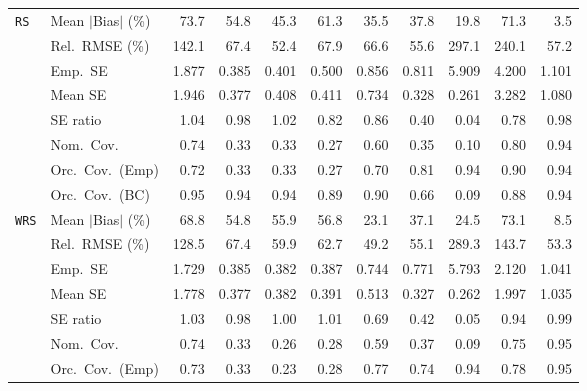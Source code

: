 \begin{landscape}
\begin{longtable}{llrrrrrrrrr}
\addlinespace[2pt]
\quad \texttt{RS} & Mean $|$Bias$|$ (\%) & 73.7 & 54.8 & 45.3 & 61.3 & \cellcolor{rankthree}35.5 & 37.8 & \cellcolor{ranktwo}19.8 & 71.3 & \cellcolor{rankone}3.5 \\
 & Rel.\ RMSE (\%) & 142.1 & 67.4 & \cellcolor{rankone}52.4 & 67.9 & 66.6 & \cellcolor{ranktwo}55.6 & 297.1 & 240.1 & \cellcolor{rankthree}57.2 \\
 & Emp.\ SE & 1.877 & 0.385 & 0.401 & 0.500 & 0.856 & 0.811 & 5.909 & 4.200 & 1.101 \\
 & Mean SE & 1.946 & 0.377 & 0.408 & 0.411 & 0.734 & 0.328 & 0.261 & 3.282 & 1.080 \\
 & SE ratio & \cellcolor{ranktwo}1.04 & \cellcolor{rankone}0.98 & \cellcolor{rankone}1.02 & 0.82 & \cellcolor{rankthree}0.86 & 0.40 & 0.04 & 0.78 & \cellcolor{rankone}0.98 \\
 & Nom.\ Cov. & \cellcolor{rankthree}0.74 & 0.33 & 0.33 & 0.27 & 0.60 & 0.35 & 0.10 & \cellcolor{ranktwo}0.80 & \cellcolor{rankone}0.94 \\
 & Orc.\ Cov.\ (Emp) & 0.72 & 0.33 & 0.33 & 0.27 & 0.70 & \cellcolor{rankthree}0.81 & \cellcolor{rankone}0.94 & \cellcolor{ranktwo}0.90 & \cellcolor{rankone}0.94 \\
 & Orc.\ Cov.\ (BC) & \cellcolor{rankone}0.95 & \cellcolor{ranktwo}0.94 & \cellcolor{ranktwo}0.94 & 0.89 & \cellcolor{rankthree}0.90 & 0.66 & 0.09 & 0.88 & \cellcolor{ranktwo}0.94 \\
\addlinespace[2pt]
\quad \texttt{WRS} & Mean $|$Bias$|$ (\%) & 68.8 & 54.8 & 55.9 & 56.8 & \cellcolor{ranktwo}23.1 & 37.1 & \cellcolor{rankthree}24.5 & 73.1 & \cellcolor{rankone}8.5 \\
 & Rel.\ RMSE (\%) & 128.5 & 67.4 & 59.9 & 62.7 & \cellcolor{rankone}49.2 & \cellcolor{rankthree}55.1 & 289.3 & 143.7 & \cellcolor{ranktwo}53.3 \\
 & Emp.\ SE & 1.729 & 0.385 & 0.382 & 0.387 & 0.744 & 0.771 & 5.793 & 2.120 & 1.041 \\
 & Mean SE & 1.778 & 0.377 & 0.382 & 0.391 & 0.513 & 0.327 & 0.262 & 1.997 & 1.035 \\
 & SE ratio & 1.03 & \cellcolor{rankthree}0.98 & \cellcolor{rankone}1.00 & \cellcolor{ranktwo}1.01 & 0.69 & 0.42 & 0.05 & 0.94 & \cellcolor{ranktwo}0.99 \\
 & Nom.\ Cov. & \cellcolor{rankthree}0.74 & 0.33 & 0.26 & 0.28 & 0.59 & 0.37 & 0.09 & \cellcolor{ranktwo}0.75 & \cellcolor{rankone}0.95 \\
 & Orc.\ Cov.\ (Emp) & 0.73 & 0.33 & 0.23 & 0.28 & 0.77 & 0.74 & \cellcolor{ranktwo}0.94 & \cellcolor{rankthree}0.78 & \cellcolor{rankone}0.95 \\

\end{longtable}
\end{landscape}
